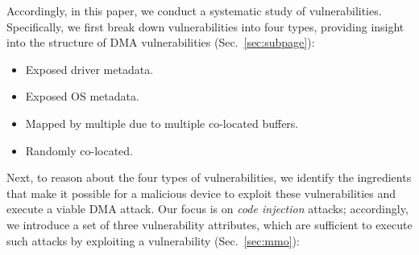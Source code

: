 
Accordingly, in this paper, we conduct a systematic study of \subpage{} vulnerabilities. Specifically, we first break down \subpage{} vulnerabilities into four types, providing insight into the structure of DMA vulnerabilities (Sec.~\ref{sec:subpage}):
\begin{itemize}
    \item Exposed driver metadata.
    \item Exposed OS metadata. 
    \item Mapped by multiple \iova due to multiple co-located buffers.
    \item Randomly co-located.
\end{itemize}


Next, to reason about the four types of \subpage{} vulnerabilities, we identify the ingredients that make it possible for a malicious device to exploit these vulnerabilities and execute a viable DMA attack.
Our focus is on \emph{code injection} attacks; accordingly, we introduce a set of three vulnerability attributes, which are sufficient to execute such attacks by exploiting a \subpage{} vulnerability (Sec.~\ref{sec:mmo}):

